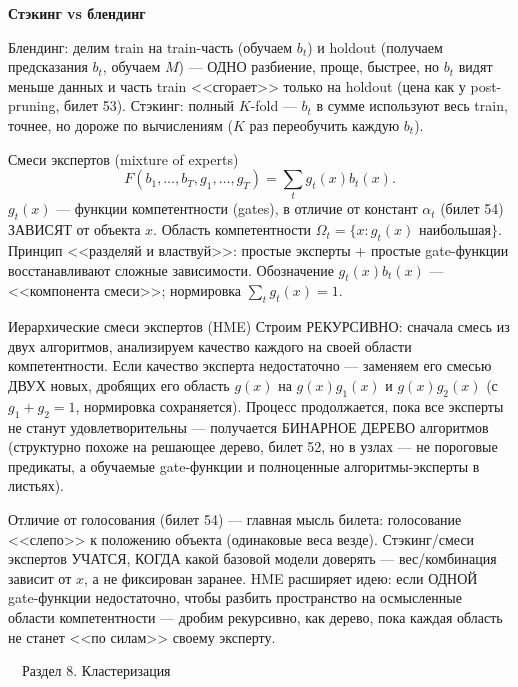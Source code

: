 \documentclass[12pt, a4paper]{article}
\newcommand{\razdel}[2]{%
  \clearpage%
  \noindent\colorbox{razdelcol}{\parbox{\dimexpr\linewidth-2\fboxsep\relax}{%
    \color{white}\LARGE\bfseries\strut\ \ Раздел #1. #2%
  }}%
  \vspace{10pt}%
}
\newcommand{\qsub}[1]{%
  \vspace{5pt}%
  {\bfseries\color{defblue} #1}%
  \par\vspace{2pt}%
}
\begin{document}
\qsub{Стэкинг vs блендинг}
Блендинг: делим train на train-часть (обучаем $b_t$) и holdout (получаем предсказания $b_t$, обучаем $M$) --- ОДНО разбиение, проще, быстрее, но $b_t$ видят меньше данных и часть train <<сгорает>> только на holdout (цена как у post-pruning, билет 53). Стэкинг: полный $K$-fold --- $b_t$ в сумме используют весь train, точнее, но дороже по вычислениям ($K$ раз переобучить каждую $b_t$).

\begin{propbox}{Смеси экспертов (mixture of experts)}
\[
  F(b_1,\ldots,b_T,g_1,\ldots,g_T) = \sum_t g_t(x)b_t(x).
\]
$g_t(x)$ --- функции компетентности (gates), в отличие от констант $\alpha_t$ (билет 54) ЗАВИСЯТ от объекта $x$. Область компетентности $\Omega_t=\{x: g_t(x)$ наибольшая$\}$. Принцип <<разделяй и властвуй>>: простые эксперты + простые gate-функции восстанавливают сложные зависимости. Обозначение $g_t(x)b_t(x)$ --- <<компонента смеси>>; нормировка $\sum_t g_t(x)=1$.
\end{propbox}

\begin{defbox}{Иерархические смеси экспертов (HME)}
Строим РЕКУРСИВНО: сначала смесь из двух алгоритмов, анализируем качество каждого на своей области компетентности. Если качество эксперта недостаточно --- заменяем его смесью ДВУХ новых, дробящих его область $g(x)$ на $g(x)g_1(x)$ и $g(x)g_2(x)$ (с $g_1{+}g_2{=}1$, нормировка сохраняется). Процесс продолжается, пока все эксперты не станут удовлетворительны --- получается БИНАРНОЕ ДЕРЕВО алгоритмов (структурно похоже на решающее дерево, билет 52, но в узлах --- не пороговые предикаты, а обучаемые gate-функции и полноценные алгоритмы-эксперты в листьях).
\end{defbox}

\begin{fishkabox}
Отличие от голосования (билет 54) --- главная мысль билета: голосование <<слепо>> к положению объекта (одинаковые веса везде). Стэкинг/смеси экспертов УЧАТСЯ, КОГДА какой базовой модели доверять --- вес/комбинация зависит от $x$, а не фиксирован заранее. HME расширяет идею: если ОДНОЙ gate-функции недостаточно, чтобы разбить пространство на осмысленные области компетентности --- дробим рекурсивно, как дерево, пока каждая область не станет <<по силам>> своему эксперту.
\end{fishkabox}

\razdel{8}{Кластеризация}
\end{document}
